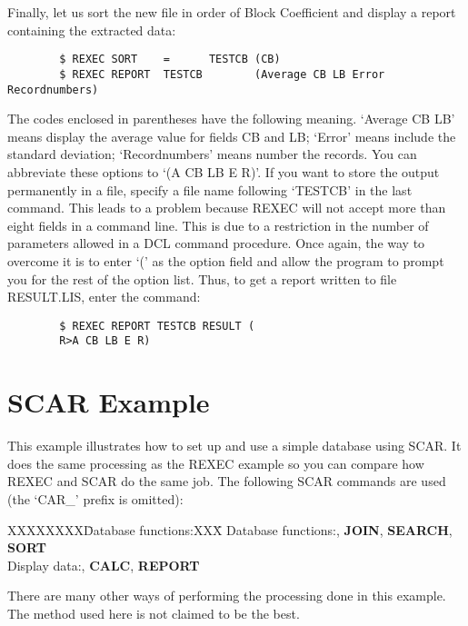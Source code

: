 Finally, let us sort the new file in order of Block Coefficient and display
a report containing the extracted data:
\begin{verbatim}
        $ REXEC SORT    =      TESTCB (CB)
        $ REXEC REPORT  TESTCB        (Average CB LB Error Recordnumbers)
\end{verbatim}
The codes enclosed in parentheses have the following meaning.
`Average CB LB' means display the average value for fields CB and LB; `Error'
means include the standard deviation; `Recordnumbers' means number the records.
You can abbreviate these options to `(A CB LB E R)'.
If you want to store the output permanently in a file, specify a file name
following `TESTCB' in the last command.
This leads to a problem because REXEC will not accept more than eight fields
in a command line.
This is due to a restriction in the number of parameters allowed in a DCL
command procedure.
Once again, the way to overcome it is to enter `(' as the option field and
allow the program to prompt you for the rest of the option list.
Thus, to get a report written to file RESULT.LIS, enter the command:
\begin{verbatim}
        $ REXEC REPORT TESTCB RESULT (
        R>A CB LB E R)
\end{verbatim}
\section {SCAR Example}
This example illustrates how to set up and use a simple database using SCAR.
It does the same processing as the REXEC example so you can compare how REXEC
and SCAR do the same job.
The following SCAR commands are used (the `CAR\_' prefix is omitted):
\begin{tabbing}
XXXXXXXX\=Database functions:XXX\=\kill
\>\+Database functions:, {\bf JOIN}, {\bf SEARCH}, {\bf SORT}\\
Display data:, {\bf CALC}, {\bf REPORT}
\end{tabbing}
There are many other ways of performing the processing done in this example.
The method used here is not claimed to be the best.

